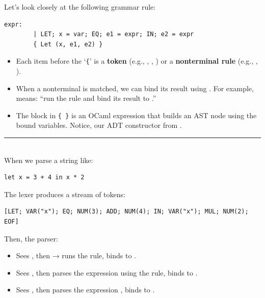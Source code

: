         \newpage 

\begin{Example}

    Let's look closely at the following grammar rule:
    
    \begin{lstlisting}[numbers=none]
    expr:
        | LET; x = var; EQ; e1 = expr; IN; e2 = expr
        { Let (x, e1, e2) }
    \end{lstlisting}
    
    \begin{itemize}
        \item Each item before the `\texttt{\{}' is a \textbf{token} (e.g., , , ) or a \textbf{nonterminal rule} (e.g., , ).
        \item When a nonterminal is matched, we can bind its result using . For example,  means: “run the  rule and bind its result to .”
        \item The block in \texttt{\{ \}} is an OCaml expression that builds an AST node using the bound variables.
        Notice,  our ADT constructor from .
    \end{itemize}
    
    \noindent
    \rule{\textwidth}{0.4pt}\\

    \noindent
    When we parse a string like:
    
    \begin{lstlisting}[numbers=none]
    let x = 3 + 4 in x * 2
    \end{lstlisting}
    
    \noindent
    The lexer produces a stream of tokens:
    
    \begin{lstlisting}[numbers=none]
 [LET; VAR("x"); EQ; NUM(3); ADD; NUM(4); IN; VAR("x"); MUL; NUM(2); EOF]
    \end{lstlisting}
    
    \noindent
    Then, the parser:
    \begin{itemize}
        \item Sees , then  → runs the  rule, binds to .
        \item Sees , then parses the expression  using the  rule, binds to .
        \item Sees , then parses the expression , binds to .
    \end{itemize}
    

\end{Example}
